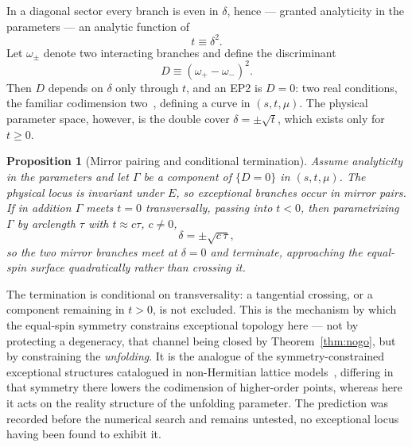 \documentclass[aps,prd,reprint,superscriptaddress,nofootinbib,longbibliography]{revtex4-2}
\theoremstyle{plain}
\newtheorem{proposition}[theorem]{Proposition}
\theoremstyle{definition}
\theoremstyle{remark}
\begin{document}
In a diagonal sector every branch is even in $\delta$, hence --- granted
analyticity in the parameters --- an analytic function of
\begin{equation}\label{eq:tdef}
  t\equiv\delta^2 .
\end{equation}
Let $\omega_\pm$ denote two interacting branches and define the discriminant
\begin{equation}\label{eq:Ddef}
  D\equiv(\omega_+-\omega_-)^2 .
\end{equation}
Then $D$ depends on $\delta$ only through $t$, and an EP2 is $D=0$: two real
conditions, the familiar codimension two~\cite{Bergholtz2019E63}, defining a
curve in $(s,t,\mu)$. The physical parameter space, however, is the double cover
$\delta=\pm\sqrt t$, which exists only for $t\ge0$.

\begin{proposition}[Mirror pairing and conditional termination]
\label{prop:termination}
Assume analyticity in the parameters and let $\Gamma$ be a component of
$\{D=0\}$ in $(s,t,\mu)$. The physical locus is invariant under $E$, so
exceptional branches occur in mirror pairs. If in addition $\Gamma$ meets $t=0$
\emph{transversally}, passing into $t<0$, then parametrizing $\Gamma$ by
arclength $\tau$ with $t\approx c\tau$, $c\ne0$,
\begin{equation}\label{eq:sqrtlaw}
  \delta=\pm\sqrt{c\,\tau},
\end{equation}
so the two mirror branches meet at $\delta=0$ and terminate, approaching the
equal-spin surface quadratically rather than crossing it.
\end{proposition}

The termination is conditional on transversality: a tangential crossing, or a
component remaining in $t>0$, is not excluded. This is the mechanism by which
the equal-spin symmetry constrains exceptional topology here --- not by
protecting a degeneracy, that channel being closed by Theorem~\ref{thm:nogo},
but by constraining the \emph{unfolding}. It is the analogue of the
symmetry-constrained exceptional structures catalogued in non-Hermitian lattice
models~\cite{Zhangetal2022E66,Mandal2021E65}, differing in that symmetry there
lowers the codimension of higher-order points, whereas here it acts on the
reality structure of the unfolding parameter. The prediction was recorded before
the numerical search and remains untested, no exceptional locus having been
found to exhibit it.

\end{document}

